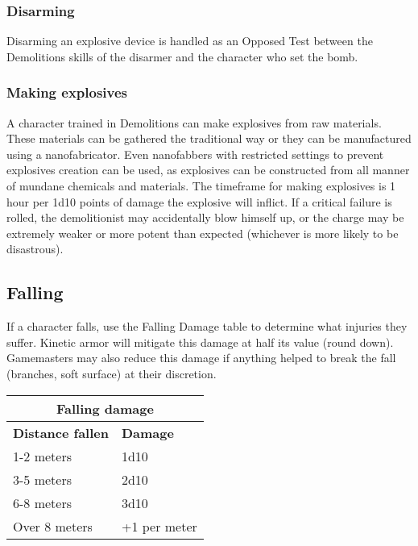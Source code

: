 \subsubsection{Disarming}

Disarming an explosive device is handled as an Opposed Test between the Demolitions skills of the disarmer and the character who set the bomb.


\subsubsection{Making explosives}

A character trained in Demolitions can make explosives from raw materials. These materials can be gathered the traditional way or they can be manufactured using a nanofabricator. Even nanofabbers with restricted settings to prevent explosives creation can be used, as explosives can be constructed from all manner of mundane chemicals and materials. The timeframe for making explosives is 1 hour per 1d10 points of damage the explosive will inflict. If a critical failure is rolled, the demolitionist may accidentally blow himself up, or the charge may be extremely weaker or more potent than expected (whichever is more likely to be disastrous).


\subsection{Falling}
\label{sec:falling}

If a character falls, use the Falling Damage table to determine what injuries they suffer. Kinetic armor will mitigate this damage at half its value (round down). Gamemasters may also reduce this damage if anything helped to break the fall (branches, soft surface) at their discretion.

\begin{table}
\begin{tabular}{|l|l|}
\hline
\multicolumn{2}{|c|}{\textbf{Falling damage}}	\\
\hline
\textbf{Distance fallen}		& \textbf{Damage}	\\
\hline
1-2 meters				& 1d10			\\
\hline
3-5 meters				& 2d10			\\
\hline
6-8 meters				& 3d10			\\
\hline
Over 8 meters				& +1 per meter		\\
\hline
\end{tabular}
\label{tab:falling-damage}
\end{table}



